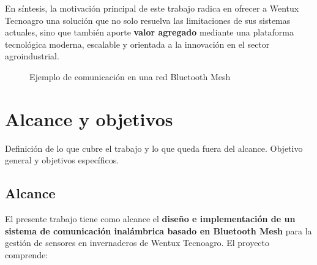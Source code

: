 En síntesis, la motivación principal de este trabajo radica en ofrecer a Wentux Tecnoagro una solución que no solo resuelva las limitaciones de sus sistemas actuales, sino que también aporte \textbf{valor agregado} mediante una plataforma tecnológica moderna, escalable y orientada a la innovación en el sector agroindustrial.

\begin{figure}[h!]
\centering
{}
\caption{Ejemplo de comunicación en una red Bluetooth Mesh}
\label{fig:ble_mesh}
\end{figure}


\section{Alcance y objetivos}

Definición de lo que cubre el trabajo y lo que queda fuera del alcance. Objetivo general y objetivos específicos.

\subsection*{Alcance}
El presente trabajo tiene como alcance el \textbf{diseño e implementación de un sistema de comunicación inalámbrica basado en Bluetooth Mesh} para la gestión de sensores en invernaderos de Wentux Tecnoagro. El proyecto comprende:

